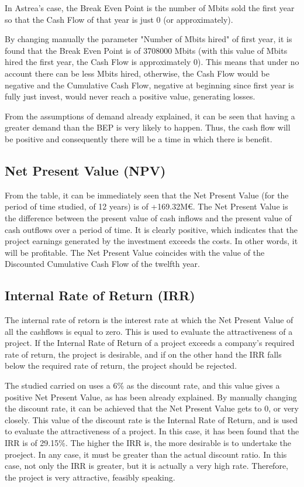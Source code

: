 In Astrea's case, the Break Even Point is the number of Mbits sold the first year so that the Cash Flow of that year is just 0 (or approximately). 

By changing manually the parameter "Number of Mbits hired" of first year, it is found that the Break Even Point is of 3708000 Mbits (with this value of Mbits hired the first year, the Cash Flow is approximately 0). This means that under no account there can be less Mbits hired, otherwise, the Cash Flow would be negative and the Cumulative Cash Flow, negative at beginning since first year is fully just invest, would never reach a positive value, generating losses. 

From the assumptions of demand already explained, it can be seen that having a greater demand than the BEP is very likely to happen. Thus, the cash flow will be positive and consequently there will be a time in which there is benefit.

\subsection{Net Present Value (NPV)}
From the table, it can be immediately seen that the Net Present Value (for the period of time studied, of 12 years) is of +169.32M\euro. The Net Present Value is the difference between the present value of cash inflows and the present value of cash outflows over a period of time. It is clearly positive, which indicates that the project earnings generated by the investment exceeds the costs. In other words, it will be profitable. The Net Present Value coincides with the value of the Discounted Cumulative Cash Flow of the twelfth year. 


\subsection{Internal Rate of Return (IRR)}
The internal rate of retorn is the interest rate at which the Net Present Value of all the cashflows is equal to zero. This is used to evaluate the attractiveness of a project. If the Internal Rate of Return of a project exceeds a company's required rate of return, the project is desirable, and if on the other hand the IRR falls below the required rate of return, the project should be rejected.

The studied carried on uses a 6\% as the discount rate, and this value gives a positive Net Present Value, as has been already explained. By manually changing the discount rate, it can be achieved that the Net Present Value gets to 0, or very closely. This value of the discount rate is the Internal Rate of Return, and is used to evaluate the attractiveness of a project. In this case, it has been found that the IRR is of 29.15\%. The higher the IRR is, the more desirable is to undertake the proeject. In any case, it must be greater than the actual discount ratio. In this case, not only the IRR is greater, but it is actually a very high rate. Therefore, the project is very attractive, feasibly speaking. 


